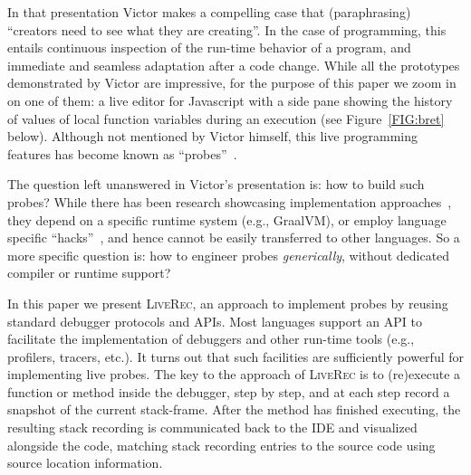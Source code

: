 \documentclass[english,submission]{programming}
\def\coolname{\textsc{LiveRec}\xspace}
\begin{document}
In that presentation Victor makes a compelling case that (paraphrasing) ``creators need to see what they are creating''. In the case of programming, this entails continuous inspection of the run-time behavior of a program, and immediate and seamless adaptation after a code change. While all the prototypes demonstrated by Victor are impressive, for the purpose of this paper we zoom in on one of them: a live editor for Javascript with a side pane showing the history of values of local function variables during an execution (see Figure~\ref{FIG:bret} below). Although not mentioned by Victor himself, this live programming features has become known as ``probes''~\cite{UsableLiveProgramming,ExampleBasedGraalVM}.

The question left unanswered in Victor's presentation is: how to build such probes? While there has been research showcasing implementation approaches~\cite{ExampleBasedGraalVM}, they depend on a specific runtime system (e.g., GraalVM), or employ language specific ``hacks''~\cite{LiveLiterals}, and hence cannot be easily transferred to other languages. So a more specific question is: how to  engineer probes \textit{generically}, without dedicated compiler or runtime support?

In this paper we present \coolname, an approach to implement probes by reusing standard debugger protocols and APIs. Most languages support an API to facilitate the implementation of debuggers and other run-time tools (e.g., profilers, tracers, etc.). It turns out that such facilities are sufficiently powerful for implementing live probes. The key to the approach of \coolname is to (re)execute a function or method inside the debugger, step by step, and at each step record a snapshot of the current stack-frame. After the method has finished executing, the resulting stack recording is communicated back to the IDE and visualized alongside the code, matching stack recording entries to the source code using source location information.
\end{document}
